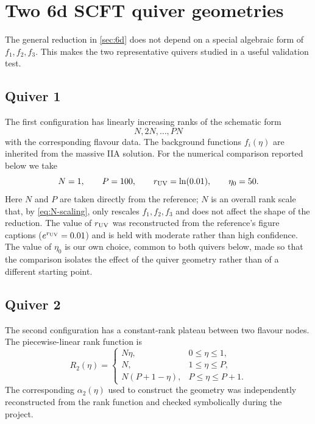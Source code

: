 \documentclass[11pt,a4paper]{article}
\theoremstyle{plain}
\theoremstyle{definition}
\theoremstyle{remark}
\begin{document}
\section{Two 6d SCFT quiver geometries}
\label{sec:quivers}

The general reduction in \cref{sec:6d} does not depend on a special algebraic form of $f_1,f_2,f_3$. This makes the two representative quivers studied in \cite{Fatemiabhari:2026rob} a useful validation test.

\subsection{Quiver 1}

The first configuration has linearly increasing ranks of the schematic form
\begin{equation*}
N,2N,\ldots,PN
\end{equation*}
with the corresponding flavour data. The background functions $f_i(\eta)$ are inherited from the massive IIA solution. For the numerical comparison reported below we take
\begin{equation*}
N=1,\qquad P=100,
\qquad
r_{\rm UV}=\ln(0.01),
\qquad
\eta_0=50.
\end{equation*}
Here $N$ and $P$ are taken directly from the reference; $N$ is an overall rank scale that, by \eqref{eq:N-scaling}, only rescales $f_1,f_2,f_3$ and does not affect the shape of the reduction. The value of $r_{\rm UV}$ was reconstructed from the reference's figure captions ($e^{r_{\rm UV}}=0.01$) and is held with moderate rather than high confidence. The value of $\eta_0$ is our own choice, common to both quivers below, made so that the comparison isolates the effect of the quiver geometry rather than of a different starting point.

\subsection{Quiver 2}

The second configuration has a constant-rank plateau between two flavour nodes. The piecewise-linear rank function is
\begin{equation*}
R_2(\eta)
=
\begin{cases}
N\eta, & 0\leq\eta\leq1,\\
N, & 1\leq\eta\leq P,\\
N(P+1-\eta), & P\leq\eta\leq P+1.
\end{cases}
\end{equation*}
The corresponding $\alpha_2(\eta)$ used to construct the geometry was independently reconstructed from the rank function and checked symbolically during the project.
\end{document}
